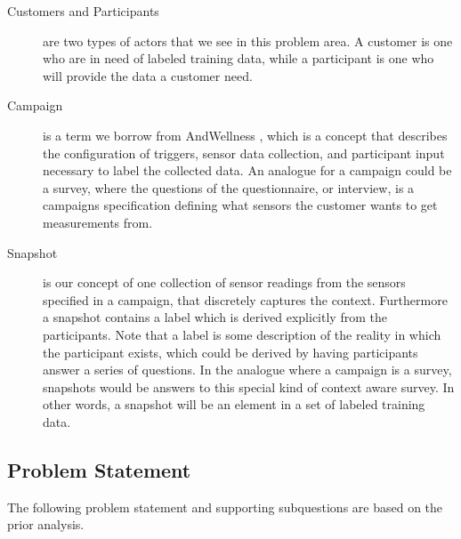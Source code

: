 \begin{description}
    \item [Customers and Participants] are two types of actors that we see in this problem area. A customer is one who are in need of labeled training data, while a participant is one who will provide the data a customer need. 
\end{description}

\begin{description}
    \item[Campaign] is a term we borrow from AndWellness \parencite{hicks2010andwellness}, which is a concept that describes the configuration of triggers, sensor data collection, and participant input necessary to label the collected data. An analogue for a campaign could be a survey, where the questions of the questionnaire, or interview, is a campaigns specification defining what sensors the customer wants to get measurements from. 
\end{description}

\begin{description}
    \item[Snapshot] is our concept of one collection of sensor readings from the sensors specified in a campaign, that discretely captures the context. Furthermore a snapshot contains a label which is derived explicitly from the participants. Note that a label is some description of the reality in which the participant exists, which could be derived by having participants answer a series of questions. In the analogue where a campaign is a survey, snapshots would be answers to this special kind of context aware survey. In other words, a snapshot will be an element in a set of labeled training data.
\end{description}

\subsection{Problem Statement}
\label{sub:problem_statement}
The following problem statement and supporting subquestions are based on the prior analysis.
\\\\


